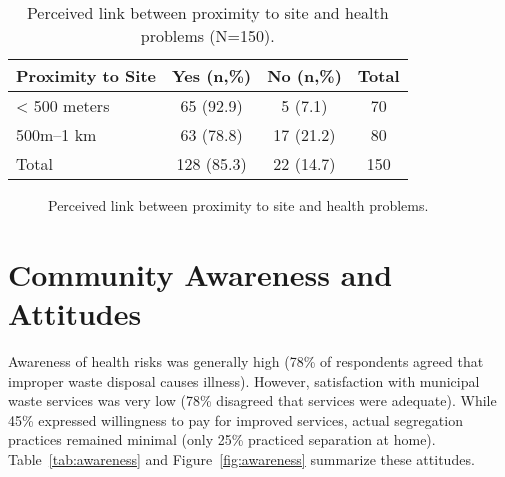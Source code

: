 \begin{table}[h!]
\centering
\caption{Perceived link between proximity to site and health problems (N=150).}
\label{tab:proximity}
\begin{tabular}{@{}lccc@{}}
\toprule
\textbf{Proximity to Site} & \textbf{Yes (n,\%)} & \textbf{No (n,\%)} & \textbf{Total} \\ 
\midrule
< 500 meters   & 65 (92.9) & 5 (7.1)   & 70 \\
500m--1 km     & 63 (78.8) & 17 (21.2) & 80 \\
\midrule
Total          & 128 (85.3) & 22 (14.7) & 150 \\
\bottomrule
\end{tabular}
\end{table}

\begin{figure}[h!]
\centering
{}
\caption{Perceived link between proximity to site and health problems.}
\label{fig:proximity}
\end{figure}


\section{Community Awareness and Attitudes}

Awareness of health risks was generally high (78\% of respondents agreed that improper waste disposal causes illness). However, satisfaction with municipal waste services was very low (78\% disagreed that services were adequate). While 45\% expressed willingness to pay for improved services, actual segregation practices remained minimal (only 25\% practiced separation at home). Table~\ref{tab:awareness} and Figure~\ref{fig:awareness} summarize these attitudes.

